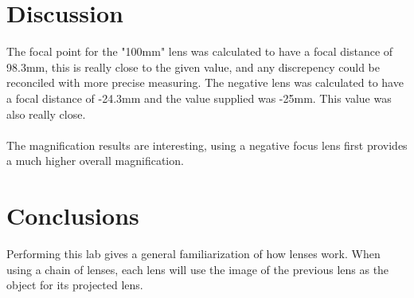 \documentclass[a4paper,12pt]{article}
\begin{document}
\section*{Discussion}
The focal point for the "100mm" lens was calculated to have a focal distance of 98.3mm, this is really close to the given value, and any discrepency could be reconciled with more precise measuring.  The negative lens was calculated to have a focal distance of -24.3mm and the value supplied was -25mm.  This value was also really close.\\
\\
The magnification results are interesting, using a negative focus lens first provides a much higher overall magnification.
\section*{Conclusions}
Performing this lab gives a general familiarization of how lenses work.  When using a chain of lenses, each lens will use the image of the previous lens as the object for its projected lens.
\end{document}
